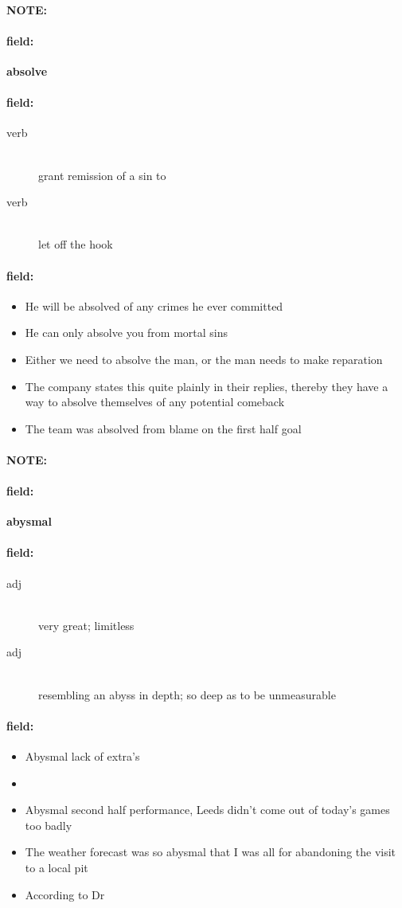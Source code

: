 \documentclass[12pt]{article}
\newenvironment{note}{\paragraph{NOTE:}}{}
\newenvironment{field}{\paragraph{field:}}{}
\begin{document}
\begin{note}
\begin{field}
\textbf{\large absolve}
\end{field}


\begin{field}
\begin{description}
\item[verb] \hfill \\ 
grant remission of a sin to

\item[verb] \hfill \\ 
let off the hook

\end{description}
\end{field}

\begin{field}
\begin{itemize}
\item He will be absolved of any crimes he ever committed
\item He can only absolve you from mortal sins
\item Either we need to absolve the man, or the man needs to make reparation
\item The company states this quite plainly in their replies, thereby they have a way to absolve themselves of any potential comeback
\item The team was absolved from blame on the first half goal
\end{itemize}
\end{field}
\end{note}
\begin{note}
\begin{field}
\textbf{\large abysmal}
\end{field}


\begin{field}
\begin{description}
\item[adj] \hfill \\ 
very great; limitless

\item[adj] \hfill \\ 
resembling an abyss in depth; so deep as to be unmeasurable

\end{description}
\end{field}

\begin{field}
\begin{itemize}
\item Abysmal lack of extra's
\item 
\item Abysmal second half performance, Leeds didn't come out of today's games too badly
\item The weather forecast was so abysmal that I was all for abandoning the visit to a local pit
\item According to Dr
\end{itemize}
\end{field}
\end{note}
\end{document}
